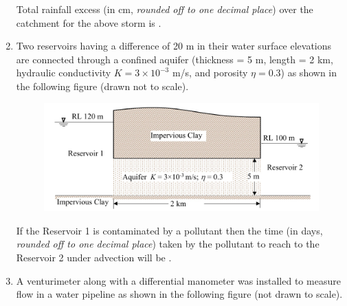 \documentclass[12pt,a4paper]{article}
\begin{document}
\begin{enumerate}
         Total rainfall excess (in cm, \textit{rounded off to one decimal place}) over the catchment for the above storm is \underline{\hspace{2cm}}.

   \item Two reservoirs having a difference of 20 m in their water surface elevations are connected through a confined aquifer (thickness = 5 m, length = 2 km, hydraulic conductivity $K = 3 \times 10^{-3}$ m/s, and porosity $\eta = 0.3$) as shown in the following figure (drawn not to scale).

         \begin{figure}[H]
            \centering
            \includegraphics[scale=0.4]{q57}
            \label{fig:q57}
         \end{figure}

         If the Reservoir 1 is contaminated by a pollutant then the time (in days, \textit{rounded off to one decimal place}) taken by the pollutant to reach to the Reservoir 2 under advection will be \underline{\hspace{2cm}}.

   \item A venturimeter along with a differential manometer was installed to measure flow in a water pipeline as shown in the following figure (not drawn to scale).


\end{enumerate}
\end{document}
